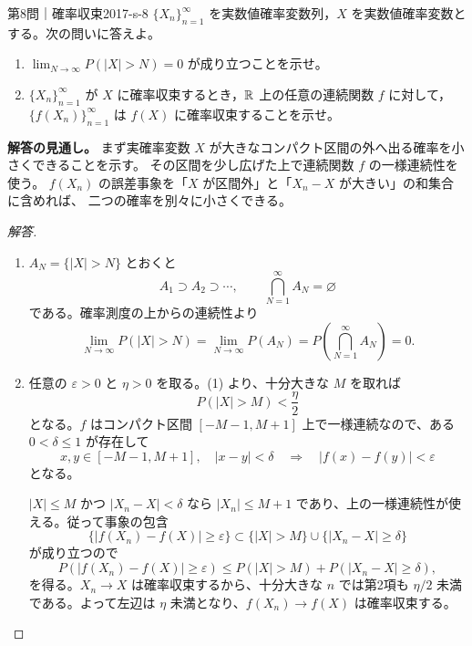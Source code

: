 \begin{problem}{第8問｜確率収束}{2017-s-8}
$\{X_n\}_{n=1}^\infty$ を実数値確率変数列，$X$ を実数値確率変数とする。次の問いに答えよ。
\begin{enumerate}
  \item[(1)] $\displaystyle\lim_{N\to\infty}P(|X|>N)=0$ が成り立つことを示せ。
  \item[(2)] $\{X_n\}_{n=1}^\infty$ が $X$ に確率収束するとき，$\mathbb{R}$ 上の任意の連続関数 $f$ に対して，$\{f(X_n)\}_{n=1}^\infty$ は $f(X)$ に確率収束することを示せ。
\end{enumerate}
\end{problem}
\begin{memo*}
\textbf{解答の見通し。}
まず実確率変数 $X$ が大きなコンパクト区間の外へ出る確率を小さくできることを示す。
その区間を少し広げた上で連続関数 $f$ の一様連続性を使う。
$f(X_n)$ の誤差事象を「$X$ が区間外」と「$X_n-X$ が大きい」の和集合に含めれば、
二つの確率を別々に小さくできる。
\end{memo*}
\begin{proof}[解答]
\begin{enumerate}
\item[(1)] $A_N=\{|X|>N\}$ とおくと
\[
A_1\supset A_2\supset\cdots,
\qquad \bigcap_{N=1}^{\infty}A_N=\varnothing
\]
である。確率測度の上からの連続性より
\[
\lim_{N\to\infty}P(|X|>N)
=\lim_{N\to\infty}P(A_N)
=P\left(\bigcap_{N=1}^{\infty}A_N\right)=0.
\]

\item[(2)] 任意の $\varepsilon>0$ と $\eta>0$ を取る。(1) より、十分大きな $M$ を取れば
\[
P(|X|>M)<\frac\eta2
\]
となる。$f$ はコンパクト区間 $[-M-1,M+1]$ 上で一様連続なので、ある $0<\delta\le1$ が存在して
\[
x,y\in[-M-1,M+1],\quad |x-y|<\delta
\quad\Longrightarrow\quad |f(x)-f(y)|<\varepsilon
\]
となる。

$|X|\le M$ かつ $|X_n-X|<\delta$ なら $|X_n|\le M+1$ であり、上の一様連続性が使える。従って事象の包含
\[
\{|f(X_n)-f(X)|\ge\varepsilon\}
\subset
\{|X|>M\}\cup\{|X_n-X|\ge\delta\}
\]
が成り立つので
\[
P(|f(X_n)-f(X)|\ge\varepsilon)
\le P(|X|>M)+P(|X_n-X|\ge\delta),
\]
を得る。$X_n\to X$ は確率収束するから、十分大きな $n$ では第2項も $\eta/2$ 未満である。よって左辺は $\eta$ 未満となり、$f(X_n)\to f(X)$ は確率収束する。
\end{enumerate}
\end{proof}
